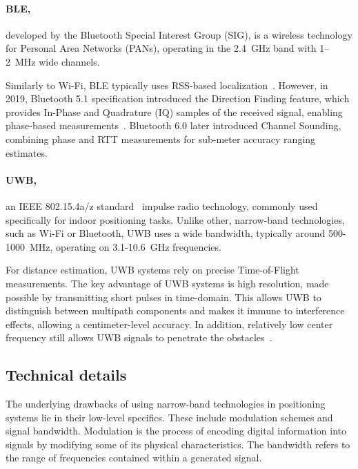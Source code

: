 \paragraph{BLE,} developed by the Bluetooth Special Interest Group (SIG), is a wireless technology for Personal Area Networks (PANs), operating in the \SI{2.4}{\giga\hertz} band with 1–2~\si{\mega\hertz} wide channels.

Similarly to Wi-Fi, BLE typically uses RSS-based localization~\cite{leitch2023indoor}. However, in 2019, Bluetooth 5.1 specification introduced the Direction Finding feature, which provides In-Phase and Quadrature (IQ) samples of the received signal, enabling phase-based measurements~\cite{Dyhdalovych2025BLE}. Bluetooth 6.0 later introduced Channel Sounding, combining phase and RTT measurements for sub-meter accuracy ranging estimates.

\paragraph{UWB,} an IEEE 802.15.4a/z standard~\cite{ieee802154} impulse radio technology, commonly used specifically for indoor positioning tasks. Unlike other, narrow-band technologies, such as Wi-Fi or Bluetooth, UWB uses a wide bandwidth, typically around 500-1000~\si{\mega\hertz}, operating on 3.1-10.6~\si{\giga\hertz} frequencies.

For distance estimation, UWB systems rely on precise Time-of-Flight measurements. The key advantage of UWB systems is high resolution, made possible by transmitting short pulses in time-domain. This allows UWB to distinguish between multipath components and makes it immune to interference effects, allowing a centimeter-level accuracy. In addition, relatively low center frequency still allows UWB signals to penetrate the obstacles~\cite{cheraghinia2024comprehensive}.

\subsection{Technical details}

The underlying drawbacks of using narrow-band technologies in positioning systems lie in their low-level specifics. These include modulation schemes and signal bandwidth. Modulation is the process of encoding digital information into signals by modifying some of its physical characteristics. The bandwidth refers to the range of frequencies contained within a generated signal.

